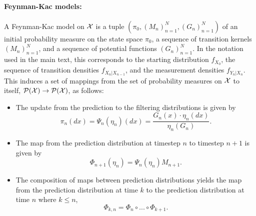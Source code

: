 \paragraph{\bf Feynman-Kac models:} A Feynman-Kac model on ${\mathcal{X}}$ is a tuple $(\pi_0, (M_n)_{n=1}^N, (G_n)_{n=1}^N)$ of an initial probability measure on the state space $\pi_0$, a sequence of transition kernels $(M_n)_{n=1}^N$, and a sequence of potential functions $(G_n)_{n=1}^N$. In the notation used in the main text, this corresponds to the starting distribution $f_{X_0}$, the sequence of transition densities $f_{X_{n}|X_{n-1}}$, and the measurement densities $f_{Y_n|X_n}$. This induces a set of mappings from the set of probability measures on ${\mathcal{X}}$ to itself, $\mathcal{P}({\mathcal{X}}) \to \mathcal{P}({\mathcal{X}})$, as follows:
\begin{itemize}
    \item The update from the prediction to the filtering distributions is given by 
    \begin{equation}
    \pi_n(dx) = \Psi_n(\eta_n)(dx) = \frac{G_n(x)\cdot\eta_n(dx)}{\eta_n(G_n)}.
    \end{equation}
    \item The map from the prediction distribution at timestep $n$ to timestep $n+1$ is given by 
    \begin{equation}
 \Phi_{n+1}(\eta_n) = \Psi_n(\eta_n) M_{n+1}.       
    \end{equation}
    \item The composition of maps between prediction distributions yields the map from the prediction distribution at time $k$ to the prediction distribution at time $n$ where $k \leq n$,
    \begin{equation}
 \Phi_{k,n} = \Phi_n \circ ... \circ \Phi_{k+1}.       
    \end{equation}
\end{itemize}
